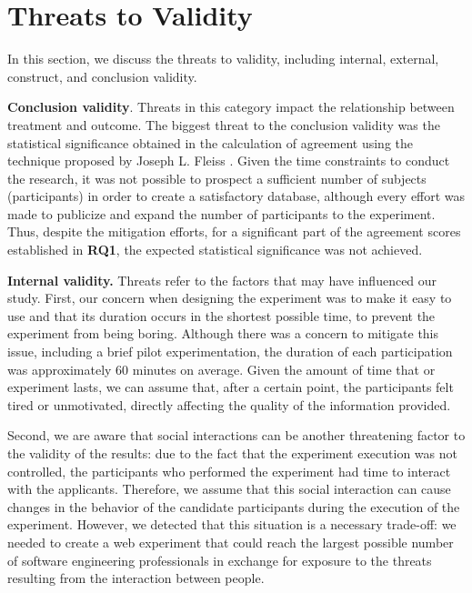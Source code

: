 \chapter{Threats to Validity}
\label{sec:limitations-threats}

In this section, we discuss the threats to validity, including internal, external, construct, and conclusion validity.

\textbf{Conclusion validity}. Threats in this category
impact the relationship between treatment and outcome. The biggest threat to the conclusion validity was the statistical significance obtained in the calculation of agreement using the technique proposed by Joseph L. Fleiss \cite{fleiss1971measuring}. Given the time constraints to conduct the research, it was not possible to prospect a sufficient number of subjects (participants) in order to create a satisfactory database, although every effort was made to publicize and expand the number of participants to the experiment. Thus, despite the mitigation efforts, for a significant part of the agreement scores established in \textbf{RQ1}, the expected statistical significance was not achieved.

\textbf{Internal validity.} Threats refer to the factors that may have influenced our study.  First, our concern when designing the experiment was to make it easy to use and that its duration occurs in the shortest possible time, to prevent the experiment from being boring. Although there was a concern to mitigate this issue, including a brief pilot experimentation, the duration of each participation was approximately 60 minutes on average. Given the amount of time that or experiment lasts, we can assume that, after a certain point, the participants felt tired or unmotivated, directly affecting the quality of the information provided.

Second, we are aware that social interactions can be another threatening factor to the validity of the results: due to the fact that the experiment execution was not controlled, the participants who performed the experiment had time to interact with the applicants. Therefore, we assume that this social interaction can cause changes in the behavior of the candidate participants during the execution of the experiment. However, we detected that this situation is a necessary trade-off: we needed to create a web experiment that could reach the largest possible number of software engineering professionals in exchange for exposure to the threats resulting from the interaction between people.

